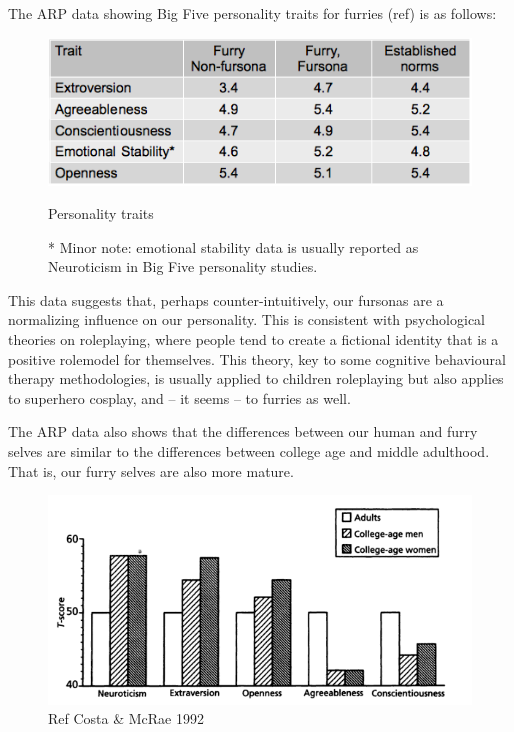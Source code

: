 The ARP data showing Big Five personality traits for furries (ref) is as follows:

\begin{figure}
  \begin{center}
    \includegraphics{content/assets/fursonas-happier--table}
  \end{center}
  \begin{caption}
    Personality traits

    * Minor note: emotional stability data is usually reported as Neuroticism in Big Five personality studies.
  \end{caption}
\end{figure}

This data suggests that, perhaps counter-intuitively, our fursonas are a normalizing influence on our personality. This is consistent with psychological theories on roleplaying, where people tend to create a fictional identity that is a positive rolemodel for themselves. This theory, key to some cognitive behavioural therapy methodologies, is usually applied to children roleplaying but also applies to superhero cosplay, and -- it seems -- to furries as well.

The ARP data also shows that the differences between our human and furry selves are similar to the differences between college age and middle adulthood. That is, our furry selves are also more mature.

\begin{figure}
  \begin{center}
    \includegraphics{content/assets/fursonas-happier--bar-chart}
  \end{center}
  \caption{Ref Costa \& McRae 1992}
\end{figure}

